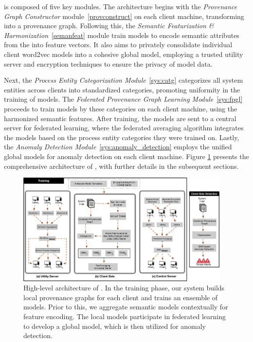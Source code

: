 \Sys is composed of five key modules. The architecture begins with the \textit{Provenance Graph Constructor} module~\ref{provconstruct} on each client machine, transforming \logs into a provenance graph. Following this, the \textit{Semantic Featurization \& Harmonization}~\ref{semanfeat} module train \wordvec models to encode semantic attributes from the \logs into feature vectors. It also aims to privately consolidate individual client word2vec models into a cohesive global model, employing a trusted utility server and encryption techniques to ensure the privacy of model data.

Next, the \textit{Process Entity Categorization Module}~\ref{sys:catg} categorizes all system entities across clients into standardized categories, promoting uniformity in the training of \gnnshort models. The \textit{Federated Provenance Graph Learning Module}~\ref{sys:fpgl} proceeds to train \gnnshort models by these categories on each client machine, using the harmonized semantic features. After training, the models are sent to a central server for federated learning, where the federated averaging algorithm integrates the models based on the process entity categories they were trained on. Lastly, the \textit{Anomaly Detection Module}~\ref{sys:anomaly_detection} employs the unified global models for anomaly detection on each client machine. Figure \ref{fig:arch} presents the comprehensive architecture of \Sys, with further details in the subsequent sections.


\begin{figure}[t!]
  \centering
  \includegraphics[width=0.95\textwidth]{fig/archv3.pdf}
  \caption{High-level architecture of \Sys. In the training phase, our system builds local provenance graphs for each client and trains an ensemble of \gnnshort models. Prior to this, we aggregate semantic models contextually for feature encoding. The local \gnnshort models participate in federated learning to develop a global \gnnshort model, which is then utilized for anomaly detection.}
  \vspace{-3ex}
  \label{fig:arch}
\end{figure}